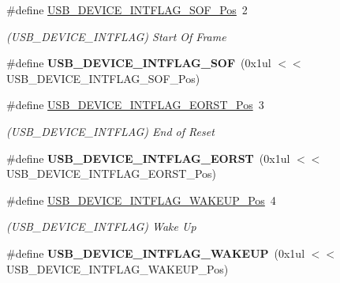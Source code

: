 \begin{DoxyCompactItemize}
\item 
\hypertarget{group___s_a_m_l21___u_s_b_gaa5455ebd696dfd37861147e2a15a7e89}{}\#define \hyperlink{group___s_a_m_l21___u_s_b_gaa5455ebd696dfd37861147e2a15a7e89}{U\+S\+B\+\_\+\+D\+E\+V\+I\+C\+E\+\_\+\+I\+N\+T\+F\+L\+A\+G\+\_\+\+S\+O\+F\+\_\+\+Pos}~2\label{group___s_a_m_l21___u_s_b_gaa5455ebd696dfd37861147e2a15a7e89}

\begin{DoxyCompactList}\small\item\em (U\+S\+B\+\_\+\+D\+E\+V\+I\+C\+E\+\_\+\+I\+N\+T\+F\+L\+A\+G) Start Of Frame \end{DoxyCompactList}\item 
\hypertarget{group___s_a_m_l21___u_s_b_ga530b25493668d4b695a411bcb5d43694}{}\#define {\bfseries U\+S\+B\+\_\+\+D\+E\+V\+I\+C\+E\+\_\+\+I\+N\+T\+F\+L\+A\+G\+\_\+\+S\+O\+F}~(0x1ul $<$$<$ U\+S\+B\+\_\+\+D\+E\+V\+I\+C\+E\+\_\+\+I\+N\+T\+F\+L\+A\+G\+\_\+\+S\+O\+F\+\_\+\+Pos)\label{group___s_a_m_l21___u_s_b_ga530b25493668d4b695a411bcb5d43694}

\item 
\hypertarget{group___s_a_m_l21___u_s_b_ga614893cb9dc255b2b4eef60e35631b44}{}\#define \hyperlink{group___s_a_m_l21___u_s_b_ga614893cb9dc255b2b4eef60e35631b44}{U\+S\+B\+\_\+\+D\+E\+V\+I\+C\+E\+\_\+\+I\+N\+T\+F\+L\+A\+G\+\_\+\+E\+O\+R\+S\+T\+\_\+\+Pos}~3\label{group___s_a_m_l21___u_s_b_ga614893cb9dc255b2b4eef60e35631b44}

\begin{DoxyCompactList}\small\item\em (U\+S\+B\+\_\+\+D\+E\+V\+I\+C\+E\+\_\+\+I\+N\+T\+F\+L\+A\+G) End of Reset \end{DoxyCompactList}\item 
\hypertarget{group___s_a_m_l21___u_s_b_ga52b56e82234b7942012de0b2862a6246}{}\#define {\bfseries U\+S\+B\+\_\+\+D\+E\+V\+I\+C\+E\+\_\+\+I\+N\+T\+F\+L\+A\+G\+\_\+\+E\+O\+R\+S\+T}~(0x1ul $<$$<$ U\+S\+B\+\_\+\+D\+E\+V\+I\+C\+E\+\_\+\+I\+N\+T\+F\+L\+A\+G\+\_\+\+E\+O\+R\+S\+T\+\_\+\+Pos)\label{group___s_a_m_l21___u_s_b_ga52b56e82234b7942012de0b2862a6246}

\item 
\hypertarget{group___s_a_m_l21___u_s_b_ga2c68ce7aca5afcc9b55044c60765980c}{}\#define \hyperlink{group___s_a_m_l21___u_s_b_ga2c68ce7aca5afcc9b55044c60765980c}{U\+S\+B\+\_\+\+D\+E\+V\+I\+C\+E\+\_\+\+I\+N\+T\+F\+L\+A\+G\+\_\+\+W\+A\+K\+E\+U\+P\+\_\+\+Pos}~4\label{group___s_a_m_l21___u_s_b_ga2c68ce7aca5afcc9b55044c60765980c}

\begin{DoxyCompactList}\small\item\em (U\+S\+B\+\_\+\+D\+E\+V\+I\+C\+E\+\_\+\+I\+N\+T\+F\+L\+A\+G) Wake Up \end{DoxyCompactList}\item 
\hypertarget{group___s_a_m_l21___u_s_b_gab02c164bacb2384a8696dcac216bbb4f}{}\#define {\bfseries U\+S\+B\+\_\+\+D\+E\+V\+I\+C\+E\+\_\+\+I\+N\+T\+F\+L\+A\+G\+\_\+\+W\+A\+K\+E\+U\+P}~(0x1ul $<$$<$ U\+S\+B\+\_\+\+D\+E\+V\+I\+C\+E\+\_\+\+I\+N\+T\+F\+L\+A\+G\+\_\+\+W\+A\+K\+E\+U\+P\+\_\+\+Pos)\label{group___s_a_m_l21___u_s_b_gab02c164bacb2384a8696dcac216bbb4f}


\end{DoxyCompactItemize}
